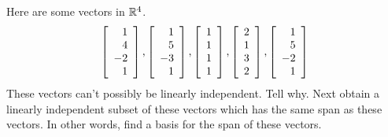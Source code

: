\begin{enumialphparenastyle}
\begin{ex} Here are some vectors in $\mathbb{R}^{4}$. 
\begin{equation*}
\left[ 
\begin{array}{r}
1 \\ 
4 \\ 
-2 \\ 
1
\end{array}
\right] ,\left[ 
\begin{array}{r}
1 \\ 
5 \\ 
-3 \\ 
1
\end{array}
\right] ,\left[ 
\begin{array}{r}
1 \\ 
1 \\ 
1 \\ 
1
\end{array}
\right] ,\left[ 
\begin{array}{r}
2 \\ 
1 \\ 
3 \\ 
2
\end{array}
\right] ,\left[ 
\begin{array}{r}
1 \\ 
5 \\ 
-2 \\ 
1
\end{array}
\right]
\end{equation*}
These vectors can't possibly be linearly independent. Tell why. Next obtain a
linearly independent subset of these vectors which has the same span as
these vectors. In other words, find a basis for the span of these vectors.
\end{ex}


\end{enumialphparenastyle}
